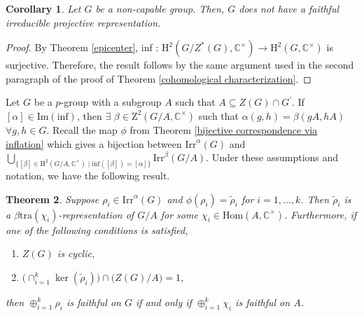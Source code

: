 \documentclass[a4paper,11pt]{amsart}
\numberwithin{equation}{section}
\numberwithin{equation}{subsection}
\newtheorem{theorem}{Theorem}[section]
\newtheorem{corollary}[theorem]{Corollary}
\newcommand{\C}{\mathbb{C}}
\newcommand{\Nayak}[1]{{\color{red} #1}}
\begin{document}
	
	\begin{corollary} \cite[Chapter 4, Theorem 3.1]{karpilovsky2} \label{non-capable groups}
		Let $G$ be a non-capable group. Then, $G$ does not have a faithful irreducible projective representation.    
	\end{corollary}
	
	\begin{proof}
		By Theorem \ref{epicenter}, inf : $\mathrm{H}^2(G/Z^*(G),\mathbb{C}^{\times})\rightarrow \mathrm{H}^2(G,\mathbb{C}^{\times})$ is surjective. Therefore, the result follows by the same argument used in the second paragraph of the proof of Theorem \ref{cohomological characterization}. 
		
	\end{proof}
	
	
	Let $G$ be a $p$-group with a subgroup $A$ such that $A \subseteq Z(G) \cap G^\prime$. If $[\alpha] \in \mathrm{Im} (\mathrm{inf})$, then $\exists$ $\beta \in \mathrm{Z}^2(G/A, \C^{\times})$ such that $\alpha(g,h) = \beta(gA,hA)$ $\forall g,h \in G$. Recall the map $\phi$ from Theorem \ref{bijective correspondence via inflation} which gives a bijection between $\mathrm{Irr}^\alpha(G)$ and $\bigcup_{\{[\beta] \in \mathrm{H}^2(G/A, \mathbb{C}^{\times}) \mid \mathrm{inf}([\beta]) = [\alpha]\}} 
	\mathrm{Irr}^\beta(G/A)$. Under these assumptions and notation, we have the following result.
	\begin{theorem} \label{direct_sum} 
		Suppose $\rho_i \in \mathrm{Irr}^\alpha(G)$ and  $\phi(\rho_i)= \tilde\rho_i$ for $i=1,...,k$. Then $\tilde\rho_i$ is a $\beta\mathrm{tra}(\chi_i)$-representation of $G/A$ for some $\chi_i\in \mathrm{Hom}(A,\mathbb{C}^{\times})$.
		Furthermore, if one of the following conditions is satisfied, 
		\begin{enumerate}
			\item $Z(G)$ is cyclic,
			\item $\big(\cap_{i=1}^k \operatorname{ker}(\tilde\rho_i)\big)\cap \big(Z(G)/A \big)= 1$,
		\end{enumerate}
		then $\oplus_{i=1}^k \rho_i$ is faithful on $G$ if and only if $\oplus_{i=1}^k \chi_i$ is faithful on $A$.
		
	\end{theorem}
	
\end{document}
